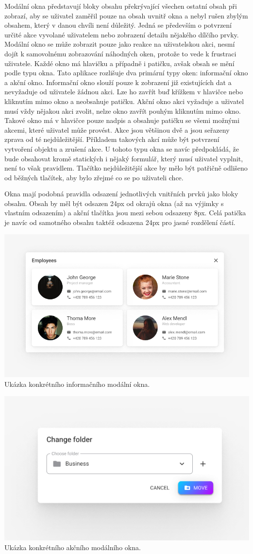 \begin{itemize}
\begin{itemize}
			Modální okna představují bloky obsahu překrývající všechen ostatní obsah při zobrazí, aby se uživatel zaměřil
			pouze na obsah uvnitř okna a nebyl rušen zbylým obsahem, který v danou chvíli není důležitý.
			Jedná se především o potvrzení určité akce vyvolané uživatelem nebo zobrazení detailu nějakého dílčího prvky.
			Modální okno se může zobrazit pouze jako reakce na uživatelskou akci, nesmí dojít k samovolnému zobrazování
			náhodných oken, protože to vede k frustraci uživatele.
			Každé okno má hlavičku a případně i patičku, avšak obsah se mění podle typu okna.
			Tato aplikace rozlišuje dva primární typy oken: informační okno a akční okno.
			Informační okno slouží pouze k zobrazení již existujících dat a nevyžaduje od uživatele žádnou akci.
			Lze ho zavřít buď křížkem v hlavičce nebo kliknutím mimo okno a neobsahuje patičku.
			Akční okno akci vyžaduje a uživatel musí vždy nějakou akci zvolit, nelze okno zavřít pouhým kliknutím mimo okno.
			Takové okno má v hlavičce pouze nadpis a obsahuje patičku se všemi možnými akcemi, které uživatel může provést.
			Akce jsou většinou dvě a jsou seřazeny zprava od té nejdůležitější.
			Příkladem takových akcí může být potvrzení vytvoření objektu a zrušení akce.
			U tohoto typu okna se navíc předpokládá, že bude obsahovat kromě statických i nějaký formulář, který musí
			uživatel vyplnit, není to však pravidlem.
			Tlačítko nejdůležitější akce by mělo být patřičně odlišeno od běžných tlačítek, aby bylo zřejmé co se po
			uživateli chce.

			Okna mají podobná pravidla odsazení jednotlivých vnitřních prvků jako bloky obsahu.
			Obsah by měl být odsazen 24px od okrajů okna (až na výjimky s vlastním odsazením) a akční tlačítka jsou
			mezi sebou odsazeny 8px.
			Celá patička je navíc od samotného obsahu taktéž odsazena 24px pro jasné rozdělení částí.

			\includegraphics[width=0.24\linewidth]{obrazky/modalni_okno_informacni_ukazka.png}\hfill
			Ukázka konkrétního informačního modální okna. %

			\includegraphics[width=0.24\linewidth]{obrazky/modalni_okno_akcni_ukazka.png}\hfill
			Ukázka konkrétního akčního modálního okna. %


\end{itemize}
\end{itemize}
